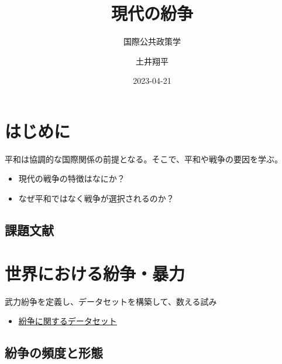 \documentclass[
  xelatex,
  ja=standard]{bxjsarticle}
\title{現代の紛争}
\subtitle{国際公共政策学}
\author{土井翔平}
\date{2023-04-21}
\providecommand{\tightlist}{%
  \setlength{\itemsep}{0pt}\setlength{\parskip}{0pt}}\usepackage{longtable,booktabs,array}
\begin{document}
\maketitle
\ifdefined\Shaded\renewenvironment{Shaded}{\begin{tcolorbox}[frame hidden, interior hidden, breakable, borderline west={3pt}{0pt}{shadecolor}, enhanced, boxrule=0pt, sharp corners]}{\end{tcolorbox}}\fi

\hypertarget{ux306fux3058ux3081ux306b}{%
\section*{はじめに}\label{ux306fux3058ux3081ux306b}}

平和は協調的な国際関係の前提となる。そこで、平和や戦争の要因を学ぶ。

\begin{itemize}
\tightlist
\item
  現代の戦争の特徴はなにか？
\item
  なぜ平和ではなく戦争が選択されるのか？
\end{itemize}

\hypertarget{ux8ab2ux984cux6587ux732e}{%
\subsection*{課題文献}\label{ux8ab2ux984cux6587ux732e}}

\hypertarget{ux4e16ux754cux306bux304aux3051ux308bux7d1bux4e89ux66b4ux529b}{%
\section{世界における紛争・暴力}\label{ux4e16ux754cux306bux304aux3051ux308bux7d1bux4e89ux66b4ux529b}}

武力紛争を定義し、データセットを構築して、数える試み\citep[序章]{tago2020}

\begin{itemize}
\tightlist
\item
  \href{https://www.cao.go.jp/pko/pko_j/organization/researcher/atpkonow/article099.html}{紛争に関するデータセット}
\end{itemize}

\hypertarget{ux7d1bux4e89ux306eux983bux5ea6ux3068ux5f62ux614b}{%
\subsection{紛争の頻度と形態}\label{ux7d1bux4e89ux306eux983bux5ea6ux3068ux5f62ux614b}}
\end{document}

